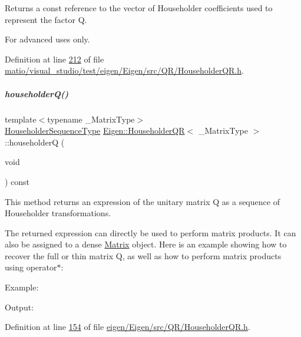 \begin{DoxyReturn}{Returns}
a const reference to the vector of Householder coefficients used to represent the factor {\ttfamily Q}.
\end{DoxyReturn}
For advanced uses only. 

Definition at line \hyperlink{matio_2visual__studio_2test_2eigen_2_eigen_2src_2_q_r_2_householder_q_r_8h_source_l00212}{212} of file \hyperlink{matio_2visual__studio_2test_2eigen_2_eigen_2src_2_q_r_2_householder_q_r_8h_source}{matio/visual\+\_\+studio/test/eigen/\+Eigen/src/\+Q\+R/\+Householder\+Q\+R.\+h}.

\mbox{\label{group___q_r___module_affd506c10ef2d25f56e7b1f9f25ff885}} 
\subparagraph{\texorpdfstring{householder\+Q()}{householderQ()}\hspace{0.1cm}{\footnotesize\ttfamily [1/2]}}
{\footnotesize\ttfamily template$<$typename \+\_\+\+Matrix\+Type$>$ \\
\hyperlink{group___householder___module_class_eigen_1_1_householder_sequence}{Householder\+Sequence\+Type} \hyperlink{group___q_r___module_class_eigen_1_1_householder_q_r}{Eigen\+::\+Householder\+QR}$<$ \+\_\+\+Matrix\+Type $>$\+::householderQ (\begin{DoxyParamCaption}\item[{void}]{ }\end{DoxyParamCaption}) const\hspace{0.3cm}{\ttfamily [inline]}}

This method returns an expression of the unitary matrix Q as a sequence of Householder transformations.

The returned expression can directly be used to perform matrix products. It can also be assigned to a dense \hyperlink{group___core___module_class_eigen_1_1_matrix}{Matrix} object. Here is an example showing how to recover the full or thin matrix Q, as well as how to perform matrix products using operator$\ast$\+:

Example\+: 
\begin{DoxyCodeInclude}
\end{DoxyCodeInclude}
 Output\+: 
\begin{DoxyVerbInclude}
\end{DoxyVerbInclude}
 

Definition at line \hyperlink{eigen_2_eigen_2src_2_q_r_2_householder_q_r_8h_source_l00154}{154} of file \hyperlink{eigen_2_eigen_2src_2_q_r_2_householder_q_r_8h_source}{eigen/\+Eigen/src/\+Q\+R/\+Householder\+Q\+R.\+h}.

